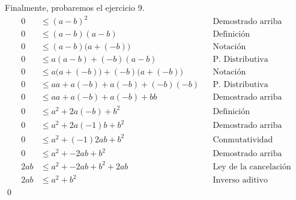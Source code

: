 \documentclass[11pt]{article}
\begin{document}
\begin{enumerate}
Finalmente, probaremos el ejercicio 9. \begin{align*}
  0 &\leq (a-b)^2 && \text{Demostrado arriba}\\
  0 &\leq (a-b)(a-b) && \text{Definición}\\
  0 &\leq (a-b)\bigl(a + (-b)\bigr) && \text{Notación}\\
  0 &\leq a(a-b)+(-b)(a-b) && \text{P. Distributiva}\\
  0 &\leq a\bigl(a+(-b)\bigr)+(-b)\bigl(a+(-b)\bigr) && \text{Notación}\\
  0 &\leq aa+a(-b)+a(-b)+(-b)(-b) && \text{P. Distributiva}\\
  0 &\leq aa+a(-b)+a(-b)+bb && \text{Demostrado arriba}\\
  0 &\leq a^2+2a(-b)+b^2 && \text{Definición}\\
  0 &\leq a^2+2a(-1)b+b^2 && \text{Demostrado arriba}\\
  0 &\leq a^2+(-1)2ab+b^2 && \text{Conmutatividad}\\
  0 &\leq a^2+-2ab+b^2 && \text{Demostrado arriba}\\
  2ab &\leq a^2+-2ab+b^2 + 2ab&& \text{Ley de la cancelación}\\
  2ab &\leq a^2+b^2&& \text{Inverso aditivo}
\end{align*}\qed
  
\end{enumerate}
\end{document}
